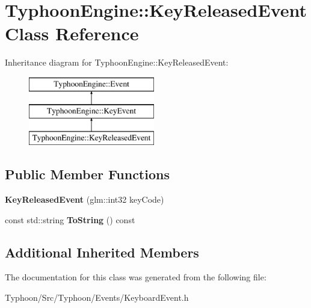 \hypertarget{class_typhoon_engine_1_1_key_released_event}{}\section{Typhoon\+Engine\+::Key\+Released\+Event Class Reference}
\label{class_typhoon_engine_1_1_key_released_event}
Inheritance diagram for Typhoon\+Engine\+::Key\+Released\+Event\+:\begin{figure}[H]
\begin{center}
\leavevmode
\includegraphics[height=3.000000cm]{class_typhoon_engine_1_1_key_released_event}
\end{center}
\end{figure}
\subsection*{Public Member Functions}
\begin{DoxyCompactItemize}
\item 
\mbox{\label{class_typhoon_engine_1_1_key_released_event_ae3d1f080919968a4a53b9d3c9fa2ff2f}} 
{\bfseries Key\+Released\+Event} (glm\+::int32 key\+Code)
\item 
\mbox{\label{class_typhoon_engine_1_1_key_released_event_aac78d4a633a7dc5ef7da9877ce362317}} 
const std\+::string {\bfseries To\+String} () const
\end{DoxyCompactItemize}
\subsection*{Additional Inherited Members}


The documentation for this class was generated from the following file\+:\begin{DoxyCompactItemize}
\item 
Typhoon/\+Src/\+Typhoon/\+Events/Keyboard\+Event.\+h\end{DoxyCompactItemize}
